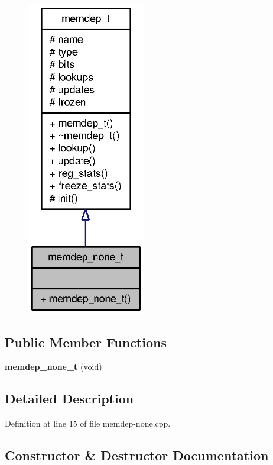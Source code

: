 \begin{figure}[H]
\begin{center}
\leavevmode
\includegraphics[width=146pt]{classmemdep__none__t__coll__graph}
\end{center}
\end{figure}
\subsection*{Public Member Functions}
\begin{CompactItemize}
\item 
{\bf memdep\_\-none\_\-t} (void)
\end{CompactItemize}


\subsection{Detailed Description}


Definition at line 15 of file memdep-none.cpp.

\subsection{Constructor \& Destructor Documentation}
